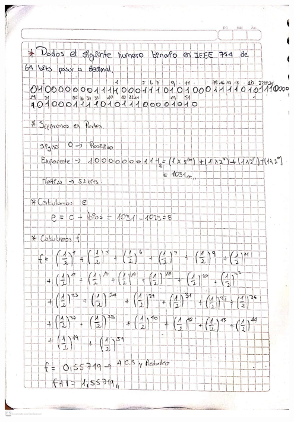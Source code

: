 \documentclass[12pt]{article}
\begin{document}
\begin{minipage}{0.95\textwidth}
    \raggedleft
    \includegraphics[width=0.95\textwidth]{inFiles/Figures/ej6.jpeg}
\end{minipage}

\vspace{0.5cm}
\end{document}
